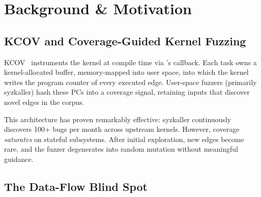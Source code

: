\documentclass{article}
\begin{document}
\section{Background \& Motivation}\label{sec:background}

\subsection{KCOV and Coverage-Guided Kernel Fuzzing}

KCOV~\cite{vyukov2016kcov} instruments the kernel at compile time via
\sancov's \tracepc callback. Each task owns a kernel-allocated buffer,
memory-mapped into user space, into which the kernel writes the program
counter of every executed edge. User-space fuzzers (primarily syzkaller)
hash these PCs into a coverage signal, retaining inputs that discover
novel edges in the corpus.

This architecture has proven remarkably effective: syzkaller continuously
discovers 100+ bugs per month across upstream kernels. However, coverage
\emph{saturates} on stateful subsystems. After initial exploration, new edges
become rare, and the fuzzer degenerates into random mutation without meaningful
guidance.

\subsection{The Data-Flow Blind Spot}
\end{document}
